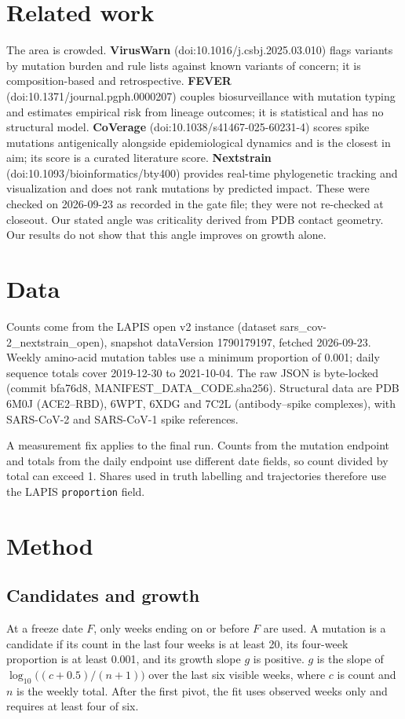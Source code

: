 \documentclass[11pt]{article}
\begin{document}
\section{Related work}
The area is crowded. \textbf{VirusWarn} (doi:10.1016/j.csbj.2025.03.010) flags variants by mutation burden and rule lists against known variants of concern; it is composition-based and retrospective. \textbf{FEVER} (doi:10.1371/journal.pgph.0000207) couples biosurveillance with mutation typing and estimates empirical risk from lineage outcomes; it is statistical and has no structural model. \textbf{CoVerage} (doi:10.1038/s41467-025-60231-4) scores spike mutations antigenically alongside epidemiological dynamics and is the closest in aim; its score is a curated literature score. \textbf{Nextstrain} (doi:10.1093/bioinformatics/bty400) provides real-time phylogenetic tracking and visualization and does not rank mutations by predicted impact. These were checked on 2026-09-23 as recorded in the gate file; they were not re-checked at closeout. Our stated angle was criticality derived from PDB contact geometry. Our results do not show that this angle improves on growth alone.

\section{Data}
Counts come from the LAPIS open v2 instance (dataset sars\_cov-2\_nextstrain\_open), snapshot dataVersion 1790179197, fetched 2026-09-23. Weekly amino-acid mutation tables use a minimum proportion of 0.001; daily sequence totals cover 2019-12-30 to 2021-10-04. The raw JSON is byte-locked (commit bfa76d8, MANIFEST\_DATA\_CODE.sha256). Structural data are PDB 6M0J (ACE2--RBD), 6WPT, 6XDG and 7C2L (antibody--spike complexes), with SARS-CoV-2 and SARS-CoV-1 spike references.

A measurement fix applies to the final run. Counts from the mutation endpoint and totals from the daily endpoint use different date fields, so count divided by total can exceed 1. Shares used in truth labelling and trajectories therefore use the LAPIS \texttt{proportion} field.

\section{Method}
\subsection{Candidates and growth}
At a freeze date $F$, only weeks ending on or before $F$ are used. A mutation is a candidate if its count in the last four weeks is at least 20, its four-week proportion is at least 0.001, and its growth slope $g$ is positive. $g$ is the slope of $\log_{10}\big((c+0.5)/(n+1)\big)$ over the last six visible weeks, where $c$ is count and $n$ is the weekly total. After the first pivot, the fit uses observed weeks only and requires at least four of six.
\end{document}
